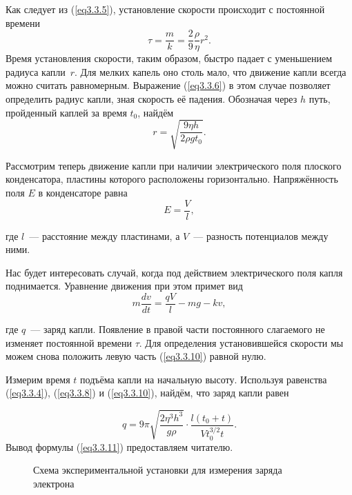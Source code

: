 Как следует из (\ref{eq3.3.5}), установление скорости происходит с постоянной времени
\begin{equation}
\tau=\frac{m}{k}=\frac 29 \frac{\rho}{\eta}r^2.
\label{eq3.3.7}
\end{equation}
Время установления скорости, таким образом, быстро падает с уменьшением радиуса капли~$r$. Для мелких капель оно столь мало, что движение капли всегда можно считать равномерным. Выражение (\ref{eq3.3.6}) в этом случае позволяет определить радиус капли, зная скорость её падения. Обозначая через $h$ путь, пройденный каплей за время $t_0$, найдём
\begin{equation}
r=\sqrt{\frac{9\eta h}{2\rho g t_0}}.
\label{eq3.3.8}
\end{equation}

Рассмотрим теперь движение капли при наличии электрического поля плоского конденсатора, пластины которого расположены горизонтально. Напряжённость поля $E$ в конденсаторе равна
\begin{equation}
E=\frac{V}{l},
\label{eq3.3.9}
\end{equation}

где $l$~--- расстояние между пластинами, а $V$~--- разность потенциалов между ними.

Нас будет интересовать случай, когда под действием электрического поля капля поднимается. Уравнение движения при этом примет вид
\begin{equation}
m\frac{dv}{dt}=\frac{qV}{l}-mg -kv,
\label{eq3.3.10}
\end{equation}

где $q$~--- заряд капли. Появление в правой части постоянного слагаемого не изменяет постоянной времени $\tau$. Для
определения установившейся скорости мы можем снова положить левую часть (\ref{eq3.3.10}) равной нулю.

Измерим время $t$ подъёма капли на начальную высоту. Используя равенства (\ref{eq3.3.4}), (\ref{eq3.3.8}) и (\ref{eq3.3.10}), найдём, что заряд капли равен

\begin{equation}
q=9\pi\sqrt{\frac{2\eta^3 h^3}{g \rho}}\cdot\frac{l(t_0+t)}{Vt_0^{3/2} t}.
\label{eq3.3.11}
\end{equation}
Вывод формулы (\ref{eq3.3.11}) предоставляем читателю.

\begin{figure}
\caption{Схема экспериментальной установки для измерения заряда электрона}
\label{fig3.3.1}
\end{figure}

